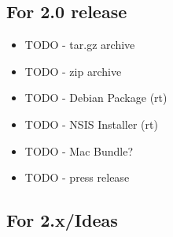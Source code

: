 \subsection{For 2.0 release}

\begin{itemize}
\item TODO - tar.gz archive
\item TODO - zip archive
\item TODO - Debian Package (rt)
\item TODO - NSIS Installer (rt)
\item TODO - Mac Bundle?
\item TODO - press release
\end{itemize}

\subsection{For 2.x/Ideas}

